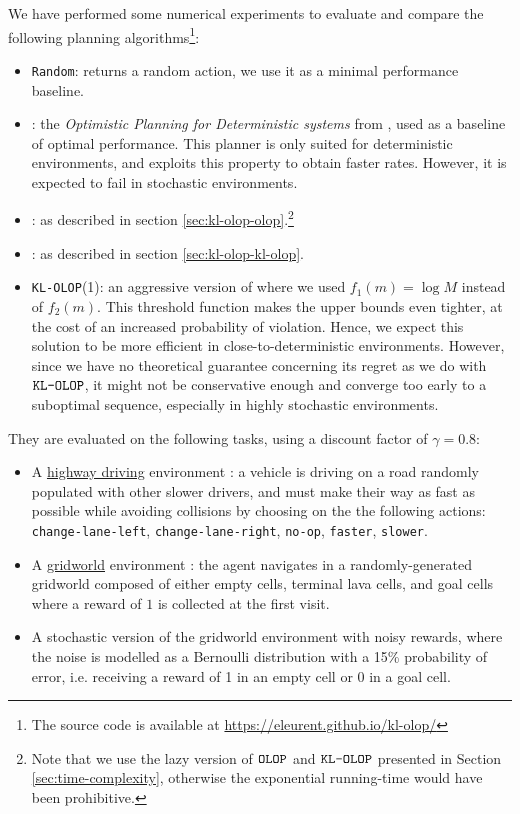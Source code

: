 We have performed some numerical experiments to evaluate and compare the following planning algorithms\footnote[1]{The source code is available at \url{https://eleurent.github.io/kl-olop/}}:
\begin{itemize}
	\item \texttt{Random}: returns a random action, we use it as a minimal performance baseline.
	\item \OPD: the \emph{Optimistic Planning for Deterministic systems} from \citep{Hren2008}, used as a baseline of optimal performance. This planner is only suited for deterministic environments, and exploits this property to obtain faster rates. However, it is expected to fail in stochastic environments.
	\item \OLOP: as described in section \ref{sec:kl-olop-olop}.\footnote[2]{Note that we use the lazy version of $\texttt{OLOP}$ and $\texttt{KL-OLOP}$ presented in Section \ref{sec:time-complexity}, otherwise the exponential running-time would have been prohibitive.}
	\item \KLOLOP: as described in section \ref{sec:kl-olop-kl-olop}.\footnotemark[2]
	\item \texttt{KL-OLOP}(1): an aggressive version of \KLOLOP where we used $f_1(m) = \log M$ instead of $f_2(m)$. This threshold function makes the upper bounds even tighter, at the cost of an increased probability of violation. Hence, we expect this solution to be more efficient in close-to-deterministic environments. However, since we have no theoretical guarantee concerning its regret as we do with $\texttt{KL-OLOP}$, it might not be conservative enough and converge too early to a suboptimal sequence, especially in highly stochastic environments.
\end{itemize}

They are evaluated on the following tasks, using a discount factor of $\gamma=0.8$:
\begin{itemize}
	\item A \href{https://github.com/eleurent/highway-env/}{highway driving} environment \citep{highway-env}: a vehicle is driving on a road randomly populated with other slower drivers, and must make their way as fast as possible while avoiding collisions by choosing on the the following actions: \texttt{change-lane-left}, \texttt{change-lane-right}, \texttt{no-op}, \texttt{faster}, \texttt{slower}.
	\item A \href{https://github.com/maximecb/gym-minigrid}{gridworld} environment \citep{gym_minigrid}: the agent navigates in a randomly-generated gridworld composed of either empty cells, terminal lava cells, and goal cells where a reward of $1$ is collected at the first visit.
	\item A stochastic version of the gridworld environment with noisy rewards, where the noise is modelled as a Bernoulli distribution with a 15\% probability of error, i.e. receiving a reward of 1 in an empty cell or 0 in a goal cell.
\end{itemize}


